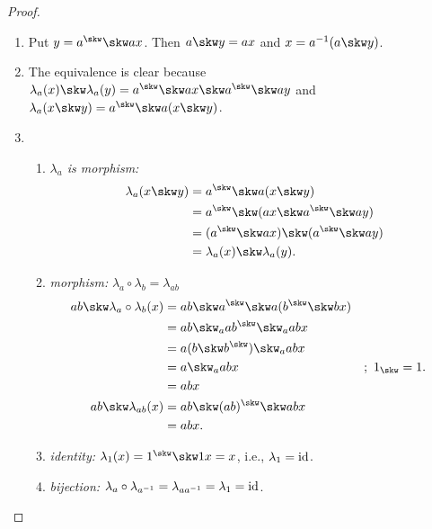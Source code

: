 \begin{proof}${}$
    \begin{enumerate}[\rm a)]
        \item Put $y=a^\skw\skw ax$. Then $a\skw y= ax$ and $x=a^{-1}(a\skw y)$.
        \item The equivalence is clear because $\lambda_a(x)\skw \lambda_a(y)=a^\skw\skw ax\skw a^\skw\skw ay$ and $\lambda_a(x\skw y)= a^\skw\skw a(x\skw y)$. 
        
        \item
        \begin{enumerate}[-]
            \item \textit{$\lambda_a$ is morphism:}
                \begin{align*}
                    \lambda_a(x\skw y) &= a^\skw\skw a(x\skw y)\\
                        &= a^\skw\skw(ax\skw a^\skw\skw ay)\\
                        &= (a^\skw\skw ax)\skw(a^\skw\skw ay)\\
                        &= \lambda_a(x)\skw\lambda_a(y).
                \end{align*}
            \item \textit{morphism:} $\lambda_a\circ\lambda_b=\lambda_{ab}$
                \begin{align*}
                    ab\skw\lambda_a\circ\lambda_b(x) &=
                            ab\skw a^\skw\skw a(b^\skw\skw bx)\\
                        &= ab\skw_a ab^\skw\skw_aabx\\
                        &= a(b\skw b^\skw)\skw_aabx\\
                        &= a\skw_aabx   &&;\ 1_{\skw}=1.\\
                        &= abx\\
                    ab\skw\lambda_{ab}(x) &= ab\skw (ab)^\skw\skw abx\\
                        &= abx.
                \end{align*}
            \item \textit{identity:} $\lambda_1(x)= 1^\skw\skw1x= x$, i.e., $\lambda_1=\operatorname{id}$.
            \item \textit{bijection:} $\lambda_a\circ\lambda_{a^{-1}}=\lambda_{aa^{-1}}=\lambda_1=\operatorname{id}$.
        \end{enumerate}
    \end{enumerate}
\end{proof}

